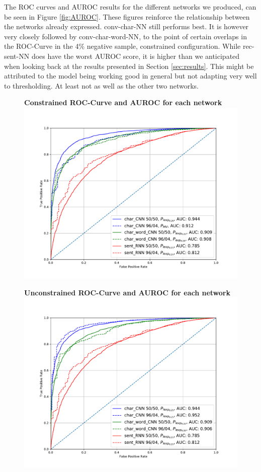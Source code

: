 The ROC curves and AUROC results for the different networks we produced, can
be seen in Figure \ref{fig:AUROC}. These figures reinforce the relationship
between the networks already expressed. \gls{conv-char-NN} still performs best.
It is however very closely followed by \gls{conv-char-word-NN}, to the point
of certain overlaps in the ROC-Curve in the 4\% negative sample, constrained
configuration. While \gls{rec-sent-NN} does have the worst AUROC score, it is
higher than we anticipated when looking back at the results presented in Section
\ref{sec:results}. This might be attributed to the model being working good in
general but not adapting very well to thresholding. At least not as well as the
other two networks.

\begin{figure}
    \centering
    \begin{minipage}{.5\textwidth}
        \centering
        \textbf{Constrained ROC-Curve and AUROC for each network}
        \includegraphics[width=1\linewidth]{./pictures/discussion/AUROC_Constrained}
    \end{minipage}%
    \begin{minipage}{.5\textwidth}
        \centering
        \textbf{Unconstrained ROC-Curve and AUROC for each network}
        \includegraphics[width=1\linewidth]{./pictures/discussion/AUROC_Unconstrained}

\end{minipage}
\end{figure}
